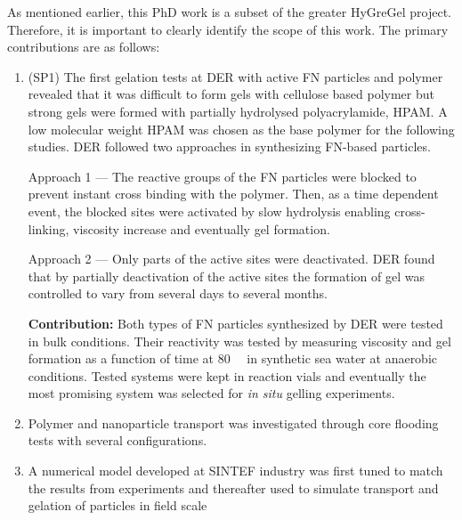 As mentioned earlier, this PhD work is a subset of the greater HyGreGel project. Therefore, it is important to clearly identify the scope of this work. The primary contributions are as follows:

\begin{enumerate}
    \item (SP1) The first gelation tests at DER with active FN particles and polymer revealed that it was difficult to form gels with cellulose based polymer but strong gels were formed with partially hydrolysed polyacrylamide, HPAM. A low molecular weight HPAM was chosen as the base polymer for the following studies. DER followed two approaches in synthesizing FN-based particles. 
    
    Approach 1 --- The reactive groups of the FN particles were blocked to prevent instant cross binding with the polymer. Then, as a time dependent event, the blocked sites were activated by slow hydrolysis enabling cross-linking, viscosity increase and eventually gel formation.
    
    Approach 2 --- Only parts of the active sites were deactivated. DER found that by partially deactivation of the active sites the formation of gel was controlled to vary from several days to several months.
    
    \textbf{Contribution:} Both types of FN particles synthesized by DER were tested in bulk conditions. Their reactivity was tested by measuring viscosity and gel formation as a function of time at 80~\celsius~ in synthetic sea water at anaerobic conditions. Tested systems were kept in reaction vials and eventually the most promising system  was selected for \emph{in situ} gelling experiments.
    
    \item Polymer and nanoparticle transport was investigated through core flooding tests with several configurations.
    \item A numerical model developed at SINTEF industry was first tuned to match the results from experiments and thereafter used to simulate transport and gelation of particles in field scale
\end{enumerate}

